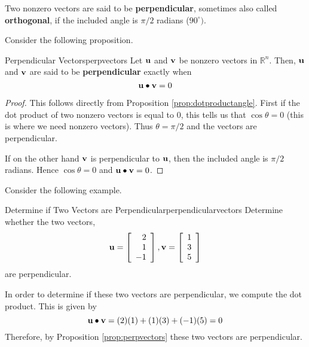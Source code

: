 Two nonzero  vectors are said to be \textbf{perpendicular},
 sometimes also called \textbf{orthogonal}, if
the included angle is $\pi /2$ radians ($90^{\circ }).$

Consider the following proposition.

\begin{proposition}{Perpendicular Vectors}{perpvectors}
Let $\mathbf{u}$ and $\mathbf{v}$ be nonzero vectors in $\mathbb{R}^n$. Then, 
$\mathbf{u}$ and $\mathbf{v}$ are said to be \textbf{perpendicular}  exactly when
\begin{equation*}
\mathbf{u}
\bullet
\mathbf{v}
=
0
\end{equation*}
\end{proposition}

\ifdefined\showproofs
\begin{proof}
This follows directly from Proposition \ref{prop:dotproductangle}. First if the dot product of
two nonzero vectors is equal to $0$, this tells us that $\cos \theta
=0$ (this is where we need nonzero vectors). Thus $\theta = \pi /2$
and the vectors are perpendicular.

If on the other hand $\mathbf{v}$ is perpendicular to $\mathbf{u}$, then 
the included angle is $\pi /2$ radians. Hence $\cos \theta =0$ and 
$\mathbf{u} \bullet \mathbf{v} = 0$.
\end{proof}
\fi
Consider the following example.

\begin{example}{Determine if Two Vectors are Perpendicular}{perpendicularvectors}
Determine whether the two vectors, 
\begin{equation*}
\mathbf{u}=
\left[
\begin{array}{r}
2 \\
1 \\
-1 
\end{array}
\right], 
\mathbf{v} 
=
\left[
\begin{array}{r}
1 \\
3 \\
5
\end{array}
\right]
\end{equation*}
 are perpendicular.
\end{example}

\begin{solution}
In order to determine if these two vectors are perpendicular, we compute the dot product.
This is given by
\begin{equation*}
\mathbf{u} \bullet \mathbf{v}
=
(2)(1) + (1)(3) + (-1)(5)
=
0
\end{equation*}
Therefore, by Proposition \ref{prop:perpvectors} these two vectors are perpendicular.
\end{solution}